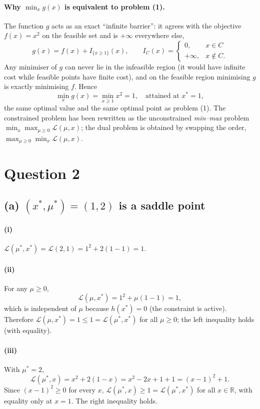 \documentclass[11pt,a4paper]{article}
\newcommand{\Lag}{\mathcal{L}}
\begin{document}
\paragraph{Why $\min_x g(x)$ is equivalent to problem (1).} The function $g$ acts as an exact ``infinite barrier'': it agrees with the objective $f(x)=x^2$ on the feasible set and is $+\infty$ everywhere else,
\[
  g(x)=f(x)+I_{\{x\ge1\}}(x),\qquad I_{C}(x)=\begin{cases}0,&x\in C\\ +\infty,&x\notin C.\end{cases}
\]
Any minimiser of $g$ can never lie in the infeasible region (it would have infinite cost while feasible points have finite cost), and on the feasible region minimising $g$ is exactly minimising $f$. Hence
\[
  \min_x g(x)=\min_{x\ge1}x^2 = 1,\quad \text{attained at } x^\ast=1,
\]
the same optimal value and the same optimal point as problem (1). The constrained problem has been rewritten as the unconstrained \emph{min--max} problem $\min_x\max_{\mu\ge0}\Lag(\mu,x)$; the dual problem is obtained by swapping the order, $\max_{\mu\ge0}\min_x\Lag(\mu,x)$.

\section{Question 2}

\subsection{(a) $(x^\ast,\mu^\ast)=(1,2)$ is a saddle point}

\paragraph{(i)} $\Lag(\mu^\ast,x^\ast)=\Lag(2,1)=1^2+2(1-1)=\boxed{1}$.

\paragraph{(ii)} For any $\mu\ge0$,
\[
  \Lag(\mu,x^\ast)=1^2+\mu(1-1)=1,
\]
which is independent of $\mu$ because $h(x^\ast)=0$ (the constraint is active). Therefore
$\Lag(\mu,x^\ast)=1\le1=\Lag(\mu^\ast,x^\ast)$ for all $\mu\ge0$; the left inequality holds (with equality).

\paragraph{(iii)} With $\mu^\ast=2$,
\[
  \Lag(\mu^\ast,x)=x^2+2(1-x)=x^2-2x+1+1=(x-1)^2+1.
\]
Since $(x-1)^2\ge0$ for every $x$, $\Lag(\mu^\ast,x)\ge1=\Lag(\mu^\ast,x^\ast)$ for all $x\in\mathbb{R}$, with equality only at $x=1$. The right inequality holds.
\end{document}
